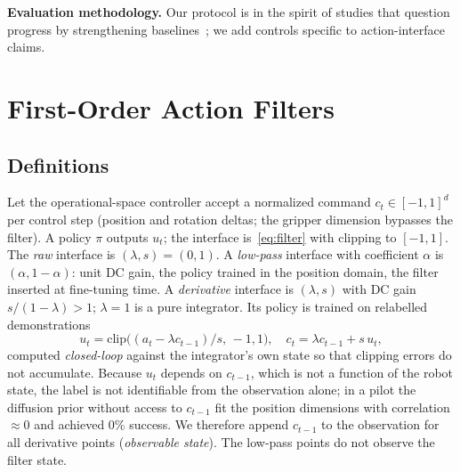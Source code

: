\documentclass[conference]{IEEEtran}
\begin{document}
\textbf{Evaluation methodology.} Our protocol is in the spirit of studies that question progress by strengthening baselines~\cite{press2024rdumbsimpleapproachquestions,dauner2023partingmisconceptionslearningbasedvehicle}; we add controls specific to action-interface claims.

\section{First-Order Action Filters}
\label{sec:theory}

\subsection{Definitions}

Let the operational-space controller accept a normalized command $c_t\in[-1,1]^d$ per control step (position and rotation deltas; the gripper dimension bypasses the filter). A policy $\pi$ outputs $u_t$; the interface is~\eqref{eq:filter} with clipping to $[-1,1]$. The \emph{raw} interface is $(\lambda,s)=(0,1)$. A \emph{low-pass} interface with coefficient $\alpha$ is $(\alpha,1-\alpha)$: unit DC gain, the policy trained in the position domain, the filter inserted at fine-tuning time. A \emph{derivative} interface is $(\lambda,s)$ with DC gain $s/(1-\lambda)>1$; $\lambda=1$ is a pure integrator. Its policy is trained on relabelled demonstrations
\begin{equation}
u_t=\mathrm{clip}\!\big((a_t-\lambda c_{t-1})/s,\,-1,1\big),\quad c_t=\lambda c_{t-1}+s\,u_t,
\label{eq:relabel}
\end{equation}
computed \emph{closed-loop} against the integrator's own state so that clipping errors do not accumulate. Because $u_t$ depends on $c_{t-1}$, which is not a function of the robot state, the label is not identifiable from the observation alone; in a pilot the diffusion prior without access to $c_{t-1}$ fit the position dimensions with correlation $\approx0$ and achieved 0\% success. We therefore append $c_{t-1}$ to the observation for all derivative points (\emph{observable state}). The low-pass points do not observe the filter state.
\end{document}
